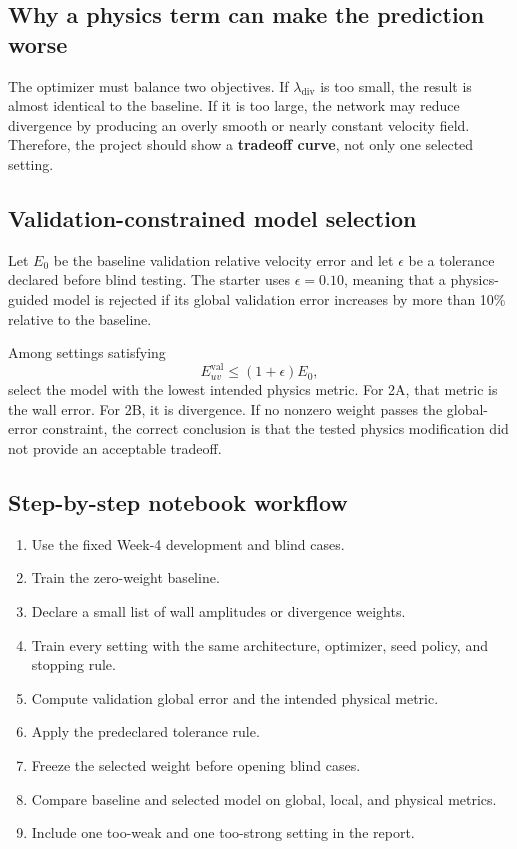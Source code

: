 \documentclass[11pt]{article}
\begin{document}
\subsection{Why a physics term can make the prediction worse}
The optimizer must balance two objectives. If $\lambda_{\mathrm{div}}$ is too small, the result is almost identical to the baseline. If it is too large, the network may reduce divergence by producing an overly smooth or nearly constant velocity field. Therefore, the project should show a \textbf{tradeoff curve}, not only one selected setting.

\subsection{Validation-constrained model selection}
Let $E_0$ be the baseline validation relative velocity error and let $\epsilon$ be a tolerance declared before blind testing. The starter uses $\epsilon=0.10$, meaning that a physics-guided model is rejected if its global validation error increases by more than 10\% relative to the baseline.

Among settings satisfying
\[
E_{uv}^{\mathrm{val}}\le(1+\epsilon)E_0,
\]
select the model with the lowest intended physics metric. For 2A, that metric is the wall error. For 2B, it is divergence. If no nonzero weight passes the global-error constraint, the correct conclusion is that the tested physics modification did not provide an acceptable tradeoff.

\subsection{Step-by-step notebook workflow}
\begin{enumerate}
\item Use the fixed Week-4 development and blind cases.
\item Train the zero-weight baseline.
\item Declare a small list of wall amplitudes or divergence weights.
\item Train every setting with the same architecture, optimizer, seed policy, and stopping rule.
\item Compute validation global error and the intended physical metric.
\item Apply the predeclared tolerance rule.
\item Freeze the selected weight before opening blind cases.
\item Compare baseline and selected model on global, local, and physical metrics.
\item Include one too-weak and one too-strong setting in the report.
\end{enumerate}
\end{document}
